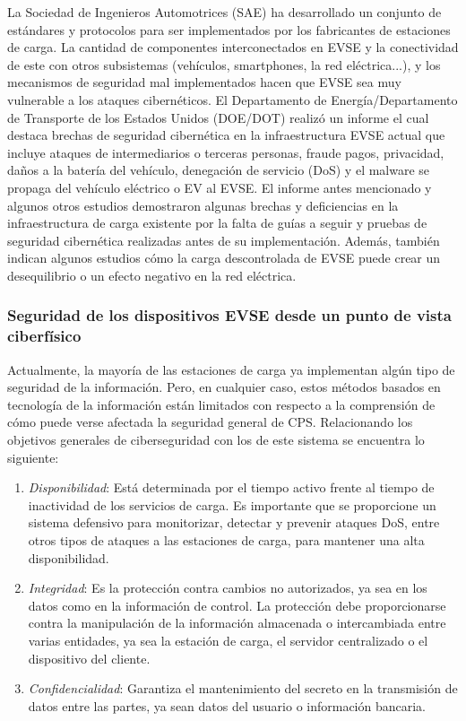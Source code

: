 \documentclass[12pt,a4paper,onecolumn,oneside]{report}
\begin{document}
La Sociedad de Ingenieros Automotrices (SAE) ha desarrollado un conjunto de estándares y protocolos para ser implementados por los fabricantes de estaciones de carga. La cantidad de componentes interconectados en EVSE y la conectividad de este con otros subsistemas (vehículos, smartphones, la red eléctrica...), y los mecanismos de seguridad mal implementados hacen que EVSE sea muy vulnerable a los ataques cibernéticos. El Departamento de Energía/Departamento de Transporte de los Estados Unidos (DOE/DOT) realizó un informe el cual destaca brechas de seguridad cibernética en la infraestructura EVSE actual que incluye ataques de intermediarios o terceras personas, fraude pagos, privacidad, daños a la batería del vehículo, denegación de servicio (DoS) y el malware se propaga del vehículo eléctrico o EV al EVSE. El informe antes mencionado y algunos otros estudios \cite{once}\cite{doce}\cite{trece} demostraron algunas brechas y deficiencias en la infraestructura de carga existente por la falta de guías a seguir y pruebas de seguridad cibernética realizadas antes de su implementación. Además, también indican algunos estudios cómo la carga descontrolada de EVSE puede crear un desequilibrio o un efecto negativo en la red eléctrica.


\subsubsection{Seguridad de los dispositivos EVSE desde un punto de vista ciberfísico}
\label{Seguridad de los dispositivos EVSE desde un punto de vista ciberfísico}

Actualmente, la mayoría de las estaciones de carga ya implementan algún tipo de seguridad de la información. Pero, en cualquier caso, estos métodos basados en tecnología de la información están limitados con respecto a la comprensión de cómo puede verse afectada la seguridad general de CPS. Relacionando los objetivos generales de ciberseguridad con los de este sistema se encuentra lo siguiente:


\begin{enumerate}

\item \textit{Disponibilidad}: Está determinada por el tiempo activo frente al tiempo de inactividad de los servicios de carga. Es importante que se proporcione un sistema defensivo para monitorizar, detectar y prevenir ataques DoS, entre otros tipos de ataques a las estaciones de carga, para mantener una alta disponibilidad.
\item \textit{Integridad}: Es la protección contra cambios no autorizados, ya sea en los datos como en la información de control. La protección debe proporcionarse contra la manipulación de la información almacenada o intercambiada entre varias entidades, ya sea la estación de carga, el servidor centralizado o el dispositivo del cliente. 
\item \textit{Confidencialidad}: Garantiza el mantenimiento del secreto en la transmisión de datos entre las partes, ya sean datos del usuario o información bancaria.

\end{enumerate}
\end{document}
